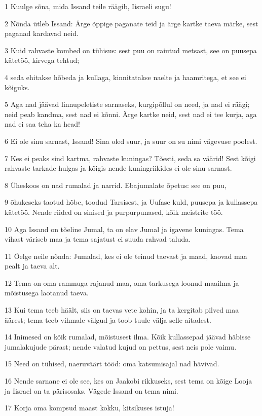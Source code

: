 \par 1 Kuulge sõna, mida Issand teile räägib, Iisraeli sugu!
\par 2 Nõnda ütleb Issand: Ärge õppige paganate teid ja ärge kartke taeva märke, sest paganad kardavad neid.
\par 3 Kuid rahvaste kombed on tühisus: sest puu on raiutud metsast, see on puusepa kätetöö, kirvega tehtud;
\par 4 seda ehitakse hõbeda ja kullaga, kinnitatakse naelte ja haamritega, et see ei kõiguks.
\par 5 Aga nad jäävad linnupeletiste sarnaseks, kurgipõllul on need, ja nad ei räägi; neid peab kandma, sest nad ei kõnni. Ärge kartke neid, sest nad ei tee kurja, aga nad ei saa teha ka head!
\par 6 Ei ole sinu sarnast, Issand! Sina oled suur, ja suur on su nimi vägevuse poolest.
\par 7 Kes ei peaks sind kartma, rahvaste kuningas? Tõesti, seda sa väärid! Sest kõigi rahvaste tarkade hulgas ja kõigis nende kuningriikides ei ole sinu sarnast.
\par 8 Üheskoos on nad rumalad ja narrid. Ebajumalate õpetus: see on puu,
\par 9 õhukeseks taotud hõbe, toodud Tarsisest, ja Uufase kuld, puusepa ja kullassepa kätetöö. Nende riided on sinised ja purpurpunased, kõik meistrite töö.
\par 10 Aga Issand on tõeline Jumal, ta on elav Jumal ja igavene kuningas. Tema vihast väriseb maa ja tema sajatust ei suuda rahvad taluda.
\par 11 Öelge neile nõnda: Jumalad, kes ei ole teinud taevast ja maad, kaovad maa pealt ja taeva alt.
\par 12 Tema on oma rammuga rajanud maa, oma tarkusega loonud maailma ja mõistusega laotanud taeva.
\par 13 Kui tema teeb häält, siis on taevas vete kohin, ja ta kergitab pilved maa äärest; tema teeb vihmale välgud ja toob tuule välja selle aitadest.
\par 14 Inimesed on kõik rumalad, mõistusest ilma. Kõik kullassepad jäävad häbisse jumalakujude pärast; nende valatud kujud on pettus, sest neis pole vaimu.
\par 15 Need on tühised, naeruväärt tööd: oma katsumisajal nad hävivad.
\par 16 Nende sarnane ei ole see, kes on Jaakobi rikkuseks, sest tema on kõige Looja ja Iisrael on ta pärisosaks. Vägede Issand on tema nimi.
\par 17 Korja oma kompsud maast kokku, kitsikuses istuja!
